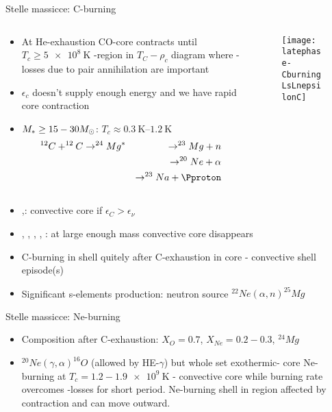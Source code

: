 \begin{frame}{Stelle massicce: C-burning}
\begin{columns}[T]
	\begin{column}{0.4\textwidth}
		\begin{itemize}
			\item At He-exhaustion CO-core contracts until $T_c\geq\SI{5e8}{\kelvin}$ -region in $T_C-\rho_c$ diagram where \Pnue-losses due to pair annihilation are important
			\item $\epsilon_c$ doesn't supply enough energy and we have rapid core contraction
			\item $M_*\geq15-30M_{\odot}$: $T_c\approx\SIrange{0.3}{1.2}{\kelvin}$
			\begin{alignat*}{2}
			&^{12}C+^{12}C\to^{24}Mg^*&\to^{23}Mg+n\\
			&&\to^{20}Ne+\alpha\\
			&&\to^{23}Na+\Pproton
			\end{alignat*}
		\end{itemize}
	\end{column}
	\begin{column}{0.5\textwidth}
		\begin{figure}[!ht]
			\texttt{[image: latephase-CburningLsLnepsilonC]}\label{fig:latephase-massive-taumburningmnext}
		\end{figure}
\end{column}\end{columns}
			\begin{itemize}
	\item {},: convective core if $\epsilon_C>\epsilon_{\nu}$
	\item {}, , , , \xaumenta{\epsilon_{\nu}}: at large enough mass convective core disappears
	\item C-burning in shell quitely after C-exhaustion in core - convective shell episode(s)
	\item Significant s-elements production: neutron source $^{22}Ne(\alpha,n)^{25}Mg$
\end{itemize}
\end{frame}

\begin{frame}{Stelle massicce: Ne-burning}
\begin{itemize}
\item Composition after C-exhaustion: $X_O=0.7$, $X_{Ne}=0.2-0.3$, $^{24}Mg$
\item $^{20}Ne(\gamma,\alpha)^{16}O$ (allowed by HE-$\gamma$) but whole set exothermic- core Ne-burning at $T_c=1.2-1.9\SI{e9}{\kelvin}$ - convective core while burning rate overcomes \Pnue-losses for short period. Ne-burning shell in region affected by contraction and can move outward.
\end{itemize}
\end{frame}

